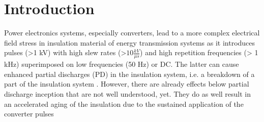 
\chapter{Introduction}
Power electronics systems, especially converters, lead to a more complex electrical field stress in insulation material of energy transmission systems as it introduces pulses (>1 kV) with high slew rates (>$10 \frac{kV}{\mu s}$) and high repetition frequencies (> 1 kHz) superimposed on low frequencies (50 Hz) or DC. The latter can cause enhanced partial discharges (PD) in the insulation system, i.e. a breakdown of a part of the insulation system \cite{TransformerEngineering}. However, there are already effects below partial discharge inception that are not well understood, yet. They do as well result in an accelerated aging of the insulation due to the sustained application of the converter pulses \cite{RepetitiveFastVoltage}
\newline

